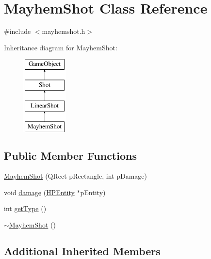 \hypertarget{class_mayhem_shot}{\section{Mayhem\-Shot Class Reference}
\label{class_mayhem_shot}
}


{\ttfamily \#include $<$mayhemshot.\-h$>$}

Inheritance diagram for Mayhem\-Shot\-:\begin{figure}[H]
\begin{center}
\leavevmode
\includegraphics[height=4.000000cm]{class_mayhem_shot}
\end{center}
\end{figure}
\subsection*{Public Member Functions}
\begin{DoxyCompactItemize}
\item 
\hyperlink{class_mayhem_shot_a0f1115fcbf4c848347e7d9b91f36b730}{Mayhem\-Shot} (Q\-Rect p\-Rectangle, int p\-Damage)
\item 
void \hyperlink{class_mayhem_shot_aae8e9c0bcac2eddc50774decf0fd7c2e}{damage} (\hyperlink{class_h_p_entity}{H\-P\-Entity} $\ast$p\-Entity)
\item 
int \hyperlink{class_mayhem_shot_a2aa6e9bf2e931477ace1731d3eed0500}{get\-Type} ()
\item 
\hyperlink{class_mayhem_shot_aab33285dd353baa3895556e664a150c0}{$\sim$\-Mayhem\-Shot} ()
\end{DoxyCompactItemize}
\subsection*{Additional Inherited Members}


